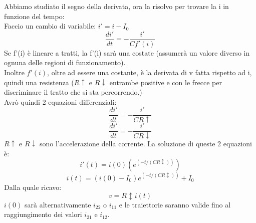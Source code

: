 \documentclass{article}
\begin{document}
Abbiamo studiato il segno della derivata, ora la risolvo per trovare la i in funzione del tempo:\\
Faccio un cambio di variabile: $i'=i-I_{0}$\\
\begin{equation}
    \frac{di'}{dt}=-\frac{i'}{Cf'(i)}
\end{equation}
Se f'(i) è lineare a tratti, la f'(i) sarà una costate (assumerà un valore diverso in ognuna delle regioni di funzionamento).\\
Inoltre $f'(i)$, oltre ad essere una costante, è la derivata di v fatta rispetto ad i, quindi una resistenza ($R\uparrow$ e $R\downarrow$ entrambe positive e con le frecce per discriminare il tratto che si sta percorrendo.)\\
Avrò quindi 2 equazioni differenziali:
\begin{equation}
    \frac{di'}{dt}=-\frac{i'}{CR\uparrow}
\end{equation}
\begin{equation}
    \frac{di'}{dt}=-\frac{i'}{CR\downarrow}
\end{equation}
$R\uparrow$ e $R\downarrow$ sono l'accelerazione della corrente.
La soluzione di queste 2 equazioni è:
\begin{equation}
    i'(t)=i(0)(e^(-t/(CR\updownarrow)))
\end{equation}
\begin{equation}
    i(t)=(i(0)-I_{0})e^(-t/(CR\updownarrow))+I_{0}
\end{equation}
Dalla quale ricavo:
\begin{equation}
    v=R\updownarrow i(t)
\end{equation}
$i(0)$ sarà alternativamente $i_{22}$ o $i_{11}$ e le traiettorie saranno valide fino al raggiungimento dei valori $i_{21}$ e $i_{12}$.
\newpage
\end{document}
